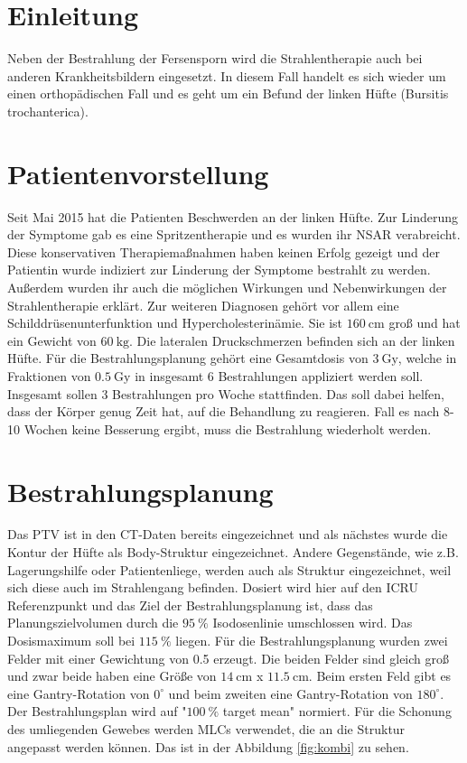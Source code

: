 \section{Einleitung}
\label{sec:Einleitung}

Neben der Bestrahlung der Fersensporn wird die Strahlentherapie auch bei anderen Krankheitsbildern eingesetzt. In diesem Fall handelt es sich wieder um einen orthopädischen Fall und es geht um ein Befund der linken Hüfte (Bursitis trochanterica). 

\section{Patientenvorstellung}
\label{sec:Vorstellung}

Seit Mai 2015 hat die Patienten Beschwerden an der linken Hüfte. Zur Linderung der Symptome gab es eine Spritzentherapie und es wurden ihr NSAR verabreicht. Diese konservativen Therapiemaßnahmen haben keinen Erfolg gezeigt und der Patientin wurde indiziert zur Linderung der Symptome bestrahlt zu werden. Außerdem wurden ihr auch die möglichen Wirkungen und Nebenwirkungen der Strahlentherapie erklärt. Zur weiteren Diagnosen gehört vor allem eine Schilddrüsenunterfunktion und Hypercholesterinämie. Sie ist $\SI{160}{\centi\meter}$ groß und hat ein Gewicht von $\SI{60}{\kilo\gram}$. Die lateralen Druckschmerzen befinden sich an der linken Hüfte. Für die Bestrahlungsplanung gehört eine Gesamtdosis von $\SI{3}{\gray}$, welche in Fraktionen von $\SI{0,5}{\gray}$ in insgesamt 6 Bestrahlungen appliziert werden soll. Insgesamt sollen 3 Bestrahlungen pro Woche stattfinden. Das soll dabei helfen, dass der Körper genug Zeit hat, auf die Behandlung zu reagieren. Fall es nach 8-10 Wochen keine Besserung ergibt, muss die Bestrahlung wiederholt werden.

\section{Bestrahlungsplanung}
\label{sec:bestrahlung}

Das PTV ist in den CT-Daten bereits eingezeichnet und als nächstes wurde die Kontur der Hüfte als Body-Struktur eingezeichnet. Andere Gegenstände, wie z.B. Lagerungshilfe oder Patientenliege, werden auch als Struktur eingezeichnet, weil sich diese auch im Strahlengang befinden. Dosiert wird hier auf den ICRU Referenzpunkt und das Ziel der Bestrahlungsplanung ist, dass das Planungszielvolumen durch die $\SI{95}{\percent}$ Isodosenlinie umschlossen wird. Das Dosismaximum soll bei $\SI{115}{\percent}$ liegen. Für die Bestrahlungsplanung wurden zwei Felder mit einer Gewichtung von 0.5 erzeugt. Die beiden Felder sind gleich groß und zwar beide haben eine Größe von  $\SI{14}{\centi\meter}$ x $\SI{11.5}{\centi\meter}$. Beim ersten Feld gibt es eine Gantry-Rotation von $0^\circ$ und beim zweiten eine Gantry-Rotation von $180^\circ$. Der Bestrahlungsplan wird auf "$\SI{100}{\percent}$ target mean" normiert. Für die Schonung des umliegenden Gewebes werden MLCs verwendet, die an die Struktur angepasst werden können. Das ist in der Abbildung \ref{fig:kombi} zu sehen. 

